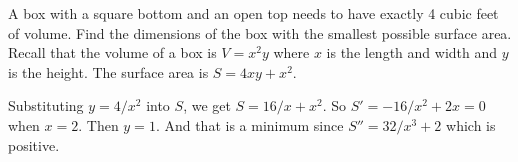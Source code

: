 \documentclass[12pt]{exam}
\newcommand{\ds}{\displaystyle}
\begin{document}
\begin{questions}
\question A box with a square bottom and an open top needs to have exactly 4 cubic feet of volume.  Find the dimensions of the box with the smallest possible surface area.  Recall that the volume of a box is $V = x^2 y$ where $x$ is the length and width and $y$ is the height.  The surface area is $S = 4xy + x^2$.  
\begin{solution}
Substituting $y = 4/x^2$ into $S$, we get $S = 16/x + x^2$.  So $S' = -16/x^2 + 2x = 0$ when $x = 2$. Then $y = 1$.  And that is a minimum since $S'' = 32/x^3 + 2$ which is positive.  
\end{solution}
\vfill
\vfill

\end{questions}

%
%
%
%
%
%
%
\end{document}
